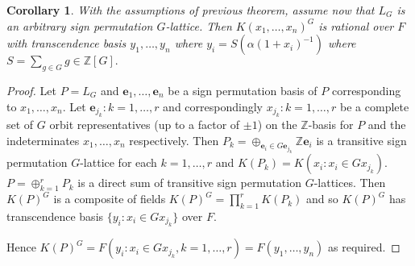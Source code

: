 \documentclass[12pt]{article}
\theoremstyle{plain}
\newtheorem{corollary}[theorem]{Corollary}
\newcommand{\Z}{\ensuremath{\mathbb{Z}}}
\begin{document}
\begin{corollary}
With the assumptions of previous theorem, assume now that $L_G$ is an arbitrary sign permutation $G$-lattice. Then $ K(x_1,\ldots , x_n)^G$ is rational over $F$ with transcendence basis $y_1, \ldots , y_n$ where $y_i = S(\alpha (1+x_i)^{-1})$ where $S = \sum_{g\in G}g \in \Z[G].$ 
\end{corollary}
\begin{proof}
Let $P = L_G$ and $\textbf{e}_1, \ldots , \textbf{e}_n$ be a sign permutation basis of $P$ corresponding to $x_1, \ldots, x_n$. Let $\textbf{e}_{j_k}: k = 1, \ldots, r$ and correspondingly $x_{j_k}: k = 1, \ldots, r$ be a complete set of $G$ orbit representatives (up to a factor of $\pm 1$) on the $\Z$-basis for $P$ and the indeterminates $x_1, \ldots, x_n$ respectively. Then $P_k = \oplus_{ \textbf{e}_i \in G \textbf{e}_{j_{k}} } \Z \textbf{e}_i$ is a transitive sign permutation $G$-lattice for each $k = 1, \ldots , r$ and $K(P_k) = K(x_i : x_i \in Gx_{j_k})$.$P = \oplus^r_{k =1} P_k$ is a direct sum of transitive sign permutation $G$-lattices. Then $K(P)^G$ is a composite of fields $K(P)^G = \prod^r_{k =1}K(P_k)$ and so $K(P)^G$ has transcendence basis $\lbrace y_i: x_i \in Gx_{j_k}\rbrace$ over $F$.

Hence $K(P)^G = F(y_i : x_i \in Gx_{j_k}, k = 1, \ldots,r) = F(y_1, \ldots,y_n)$ as required.

\end{proof}
\end{document}
